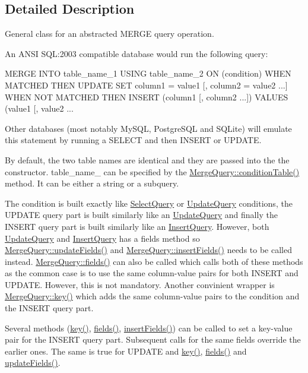 \subsection{Detailed Description}
General class for an abstracted MERGE query operation.

An ANSI SQL:2003 compatible database would run the following query:


\begin{DoxyCode}
 MERGE INTO table_name_1 USING table_name_2 ON (condition)
   WHEN MATCHED THEN
   UPDATE SET column1 = value1 [, column2 = value2 ...]
   WHEN NOT MATCHED THEN
   INSERT (column1 [, column2 ...]) VALUES (value1 [, value2 ...
\end{DoxyCode}


Other databases (most notably MySQL, PostgreSQL and SQLite) will emulate this statement by running a SELECT and then INSERT or UPDATE.

By default, the two table names are identical and they are passed into the the constructor. table\_\-name\_ can be specified by the \hyperlink{classMergeQuery_a0dbb5c2ac711fede2344a02cc49b0efb}{MergeQuery::conditionTable()} method. It can be either a string or a subquery.

The condition is built exactly like \hyperlink{classSelectQuery}{SelectQuery} or \hyperlink{classUpdateQuery}{UpdateQuery} conditions, the UPDATE query part is built similarly like an \hyperlink{classUpdateQuery}{UpdateQuery} and finally the INSERT query part is built similarly like an \hyperlink{classInsertQuery}{InsertQuery}. However, both \hyperlink{classUpdateQuery}{UpdateQuery} and \hyperlink{classInsertQuery}{InsertQuery} has a fields method so \hyperlink{classMergeQuery_ad5b51b48eaec3821181cf8e6c09bf29e}{MergeQuery::updateFields()} and \hyperlink{classMergeQuery_a1c1fef20258dad469a0853fdaddaae4e}{MergeQuery::insertFields()} needs to be called instead. \hyperlink{classMergeQuery_ae58f2865c72dfc4c310ec4c17fd4e72d}{MergeQuery::fields()} can also be called which calls both of these methods as the common case is to use the same column-\/value pairs for both INSERT and UPDATE. However, this is not mandatory. Another convinient wrapper is \hyperlink{classMergeQuery_aa34f8ac97b0571d49fbc20557dfce97b}{MergeQuery::key()} which adds the same column-\/value pairs to the condition and the INSERT query part.

Several methods (\hyperlink{classMergeQuery_aa34f8ac97b0571d49fbc20557dfce97b}{key()}, \hyperlink{classMergeQuery_ae58f2865c72dfc4c310ec4c17fd4e72d}{fields()}, \hyperlink{classMergeQuery_a1c1fef20258dad469a0853fdaddaae4e}{insertFields()}) can be called to set a key-\/value pair for the INSERT query part. Subsequent calls for the same fields override the earlier ones. The same is true for UPDATE and \hyperlink{classMergeQuery_aa34f8ac97b0571d49fbc20557dfce97b}{key()}, \hyperlink{classMergeQuery_ae58f2865c72dfc4c310ec4c17fd4e72d}{fields()} and \hyperlink{classMergeQuery_ad5b51b48eaec3821181cf8e6c09bf29e}{updateFields()}. 

